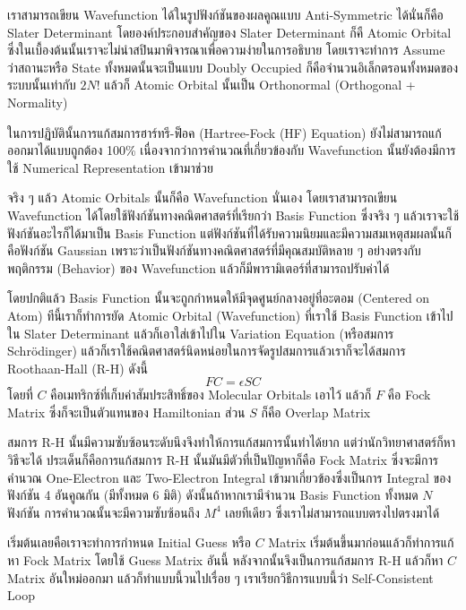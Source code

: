 เราสามารถเขียน Wavefunction ได้ในรูปฟังก์ชันของผลคูณแบบ Anti-Symmetric ได้นั่นก็คือ Slater Determinant โดยองค์ประกอบสำคัญของ Slater Determinant ก็คื Atomic Orbital ซึ่งในเบื้องต้นนั้นเราจะไม่นำสปินมาพิจารณาเพื่อความง่ายในการอธิบาย โดยเราจะทำการ Assume ว่าสถานะหรือ State ทั้งหมดนั้นจะเป็นแบบ Doubly Occupied ก็คือจำนวนอิเล็กตรอนทั้งหมดของระบบนั้นเท่ากับ $2N!$ แล้วก็ Atomic Orbital นั้นเป็น Orthonormal (Orthogonal + Normality)

ในการปฏิบัตินั้นการแก้สมการฮาร์ทรี-ฟ็อค (Hartree-Fock (HF) Equation) ยังไม่สามารถแก้ออกมาได้แบบถูกต้อง 100\% เนื่องจากว่าการคำนวณที่เกี่ยวข้องกับ Wavefunction นั้นยังต้องมีการใช้ Numerical Representation เข้ามาช่วย

จริง ๆ แล้ว Atomic Orbitals นั้นก็คือ Wavefunction นั่นเอง โดยเราสามารถเขียน Wavefunction ได้โดยใช้ฟังก์ชันทางคณิตศาสตร์ที่เรียกว่า Basis Function ซึ่งจริง ๆ แล้วเราจะใช้ฟังก์ชันอะไรก็ได้มาเป็น Basis Function แต่ฟังก์ชันที่ได้รับความนิยมและมีความสมเหตุสมผลนั้นก็คือฟังก์ชัน Gaussian เพราะว่าเป็นฟังก์ชันทางคณิตศาสตร์ที่มีคุณสมบัติหลาย ๆ อย่างตรงกับพฤติกรรม (Behavior) ของ Wavefunction แล้วก็มีพารามิเตอร์ที่สามารถปรับค่าได้

โดยปกติแล้ว Basis Function นั้นจะถูกกำหนดให้มีจุดศูนย์กลางอยู่ที่อะตอม (Centered on Atom) ทีนี้เราก็ทำการยัด Atomic Orbital (Wavefunction) ที่เราใช้ Basis Function เข้าไปใน Slater Determinant แล้วก็เอาใส่เข้าไปใน Variation Equation (หรือสมการ Schr\"{o}dinger) แล้วก็เราใช้คณิตศาสตร์นิดหน่อยในการจัดรูปสมการแล้วเราก็จะได้สมการ Roothaan-Hall (R-H) ดังนี้
%
\begin{equation}
    FC = \epsilon SC
\end{equation}
%
โดยที่ $C$ คือเมทริกซ์ที่เก็บค่าสัมประสิทธิ์ของ Molecular Orbitals เอาไว้ แล้วก็ $F$ คือ Fock Matrix ซึ่งก็จะเป็นตัวแทนของ Hamiltonian ส่วน $S$ ก็คือ Overlap Matrix

สมการ R-H นั้นมีความซับซ้อนระดับนึงจึงทำให้การแก้สมการนั้นทำได้ยาก แต่ว่านักวิทยาศาสตร์ก็หาวิธีจะได้ ประเด็นก็คือการแก้สมการ R-H นั้นมันมีตัวที่เป็นปัญหาก็คือ Fock Matrix ซึ่งจะมีการคำนวณ One-Electron และ Two-Electron Integral เข้ามาเกี่ยวข้องซึ่งเป็นการ Integral ของฟังก์ชัน 4 อันคูณกัน (มีทั้งหมด 6 มิติ) ดังนั้นถ้าหากเรามีจำนวน Basis Function ทั้งหมด $N$ ฟังก์ชัน การคำนวณนั้นจะมีความซับซ้อนถึง $M^{4}$ เลยทีเดียว ซึ่งเราไม่สามารถแบบตรงไปตรงมาได้

เริ่มต้นเลยคือเราจะทำการกำหนด Initial Guess หรือ $C$ Matrix เริ่มต้นขึ้นมาก่อนแล้วก็ทำการแก้หา Fock Matrix โดยใช้ Guess Matrix อันนี้ หลังจากนั้นจึงเป็นการแก้สมการ R-H แล้วก็หา $C$ Matrix อันใหม่ออกมา แล้วก็ทำแบบนี้วนไปเรื่อย ๆ เราเรียกวิธีการแบบนี้ว่า Self-Consistent Loop

